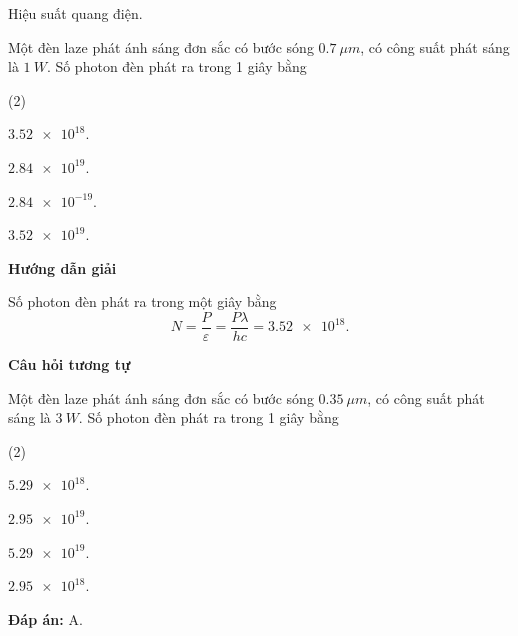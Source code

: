 \begin{dang}{Hiệu suất quang điện.}


	{
	Một đèn laze phát ánh sáng đơn sắc có bước sóng $ \SI{0,7}{\mu m} $, có công suất phát sáng là $ \SI{1}{W} $. Số photon đèn phát ra trong 1 giây bằng
		\begin{mcq}(2)
			\item $ \num{3,52e18} $. 
			\item $ \num{2,84e19} $.
			\item $ \num{2,84e-19} $. 
			\item $ \num{3,52e19} $. 
		\end{mcq}
	}
	{
	\begin{center}
	\textbf{Hướng dẫn giải}
	\end{center}
	Số photon đèn phát ra trong một giây bằng
$$
	N = \dfrac{P}{\varepsilon} = \dfrac{P \lambda}{hc} = \num{3,52e18}.
$$	
	\begin{center}
	\textbf{Câu hỏi tương tự}
	\end{center}
	
	Một đèn laze phát ánh sáng đơn sắc có bước sóng $ \SI{0,35}{\mu m} $, có công suất phát sáng là $ \SI{3}{W} $. Số photon đèn phát ra trong 1 giây bằng
		\begin{mcq}(2)
			\item $ \num{5,29 e18} $. 
			\item $ \num{2,95 e19} $.
			\item $ \num{5,29 e19} $. 
			\item $ \num{2,95 e18} $. 
		\end{mcq}
	\textbf{Đáp án:} A.
	}



\end{dang}
